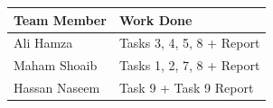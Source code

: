 \documentclass{article}
\begin{document}
\begin{table}[h]

    \begin{tabular}{|l|l|}
    \hline
    \rowcolor[HTML]{C0C0C0} 
    {\color[HTML]{333333} \textbf{Team Member}} & {\color[HTML]{333333} \textbf{Work Done}} \\ \hline
    Ali Hamza     & Tasks 3, 4, 5, 8 + Report  \\ \hline
    Maham Shoaib  & Tasks 1, 2, 7, 8  + Report \\ \hline
    Hassan Naseem & Task 9 + Task 9 Report     \\ \hline
    \end{tabular}%
    \end{table}
\end{document}
